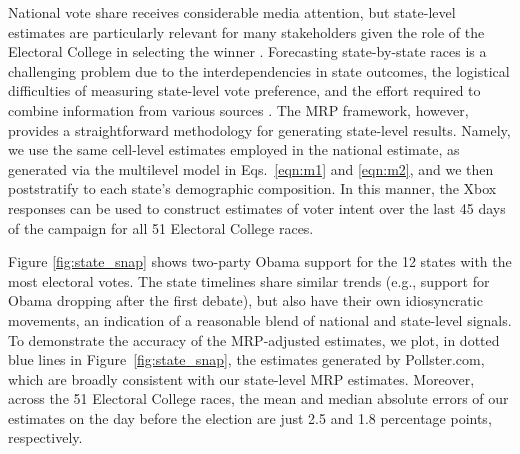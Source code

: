\documentclass[preprint,authoryear,12pt]{elsarticle}
\begin{document}
National vote share receives considerable media attention, but
state-level estimates are particularly relevant for many stakeholders given the role of the Electoral College in selecting the winner \citep{rothschild2013combining}.
Forecasting state-by-state
races is a challenging problem due to the
interdependencies in state outcomes,
the logistical difficulties of measuring state-level vote preference,
and the effort required to combine information from various sources \citep{lock_2010}.
The MRP framework, however, provides a straightforward methodology for generating state-level results.
Namely, we use the same cell-level estimates employed in the national estimate,
as generated via the multilevel model in Eqs.\ \eqref{eqn:m1} and
\eqref{eqn:m2}, and we then poststratify to each state's demographic composition.
In this manner, the Xbox responses can be used to construct
estimates of voter intent over the last 45 days of the campaign for all 51 Electoral College races.

Figure \ref{fig:state_snap} shows two-party Obama support for the 12 states with the most electoral votes.
The state timelines share similar trends (e.g., support for Obama dropping after
the first debate), but also have their own idiosyncratic movements, an indication
of a reasonable blend of national and state-level signals.
To demonstrate the accuracy of the MRP-adjusted estimates, we plot, in
dotted blue lines in Figure~\ref{fig:state_snap}, the estimates generated by
Pollster.com, which are broadly consistent with our state-level MRP estimates.
Moreover, across the 51 Electoral College races, the mean and median absolute errors of 
our estimates on the day before the election 
are just 2.5 and 1.8 percentage points, respectively.
\end{document}
